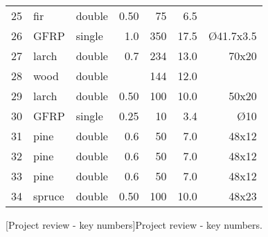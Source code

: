 \begin{table}[p]
\begin{fullpage}
\begin{tabularx}{\textwidth}{@{}lXl rrrr@{}}
25 & fir & double & 0.50 & 75 & 6.5 & \\
26 & GFRP & single & 1.0 & 350 & 17.5 & \O 41.7x3.5\\
27 & larch & double & 0.7 & 234 & 13.0 & 70x20\\
28 & wood & double &  & 144 & 12.0 & \\
29 & larch & double & 0.50 & 100 & 10.0 & 50x20\\
30 & GFRP & single & 0.25 & 10 & 3.4 & \O 10\\
31 & pine & double & 0.6 & 50 & 7.0 & 48x12\\
32 & pine & double & 0.6 & 50 & 7.0 & 48x12\\
33 & pine & double & 0.6 & 50 & 7.0 & 48x12\\
34 & spruce & double & 0.50 & 100 & 10.0 & 48x23\\
\bottomrule
 	\end{tabularx}
[Project review - key numbers]{Project review - key numbers.}
\end{fullpage}
\end{table}
